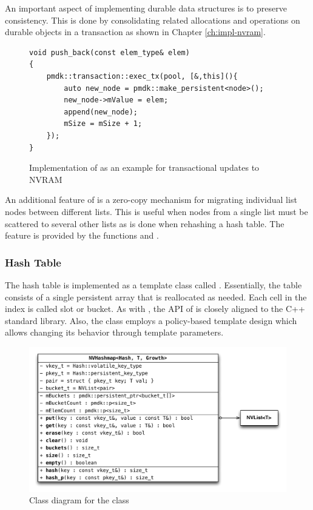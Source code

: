 An important aspect of implementing durable data structures is to preserve
consistency. This is done by consolidating related allocations and operations on
durable objects in a transaction as shown in Chapter \ref{ch:impl-nvram}.

\begin{figure}[h!]
\begin{lstlisting}
void push_back(const elem_type& elem)
{
    pmdk::transaction::exec_tx(pool, [&,this](){
        auto new_node = pmdk::make_persistent<node>();
        new_node->mValue = elem;
        append(new_node);
        mSize = mSize + 1;
    });
}
\end{lstlisting}
\caption{Implementation of  as an example for transactional updates to NVRAM}
\label{lst:impl-list-tx}
\end{figure}

An additional feature of  is a zero-copy mechanism for migrating
individual list nodes between different lists. This is useful when nodes from a
single list must be scattered to several other lists as is done when rehashing a
hash table. The feature is provided by the functions 
and .

\subsubsection{Hash Table}

The hash table is implemented as a template class called .
Essentially, the table consists of a single persistent array that is reallocated
as needed. Each cell in the index is called slot or bucket. As with
, the API of  is closely aligned to the C++
standard library. Also, the class employs a policy-based template design which
allows changing its behavior through template parameters.

\begin{figure}[h!]
    \centering
    \includegraphics[scale=0.66]{figures/impl/map.pdf}
    \caption{Class diagram for the class }
    \label{fig:impl-map}
\end{figure}

